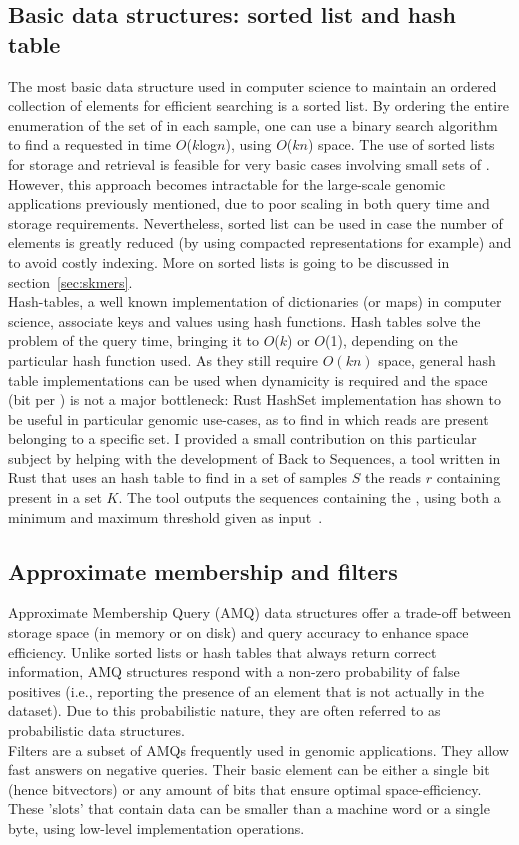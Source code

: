 \subsection{Basic data structures: sorted list and hash table}
The most basic data structure used in computer science to maintain an ordered collection of elements for efficient searching is a sorted list. By ordering the entire enumeration of the set of \kmers in each sample, one can use a binary search algorithm to find a requested \kmer in time $O$($k$log$n$), using $O$($kn$) space. The use of sorted lists for \kmer storage and retrieval is feasible for very basic cases involving small sets of \kmers. However, this approach becomes intractable for the large-scale genomic applications previously mentioned, due to poor scaling in both query time and storage requirements. Nevertheless, sorted list can be used in case the number of elements is greatly reduced (by using compacted \kmer representations for example) and to avoid costly indexing. More on sorted lists is going to be discussed in section~\ref{sec:skmers}.\\
Hash-tables, a well known implementation of dictionaries (or maps) in computer science, associate keys and values using hash functions. Hash tables solve the problem of the query time, bringing it to $O$($k$) or $O$(1), depending on the particular hash function used. As they still require $O(kn)$ space, general hash table implementations can be used when dynamicity is required and the space (bit per \kmer) is not a major bottleneck: Rust HashSet implementation has shown to be useful in particular genomic use-cases, as to find in which reads are present \kmers belonging to a specific set. I provided a small contribution on this particular subject by helping with the development of Back to Sequences, a tool written in Rust that uses an hash table to find in a set of samples $S$ the reads $r$ containing \kmers present in a set $K$. The tool outputs the sequences containing the \kmers, using both a minimum and maximum threshold given as input~\cite{back_to_sequences}.\\

\subsection{Approximate membership and filters}
Approximate Membership Query (AMQ) data structures offer a trade-off between storage space (in memory or on disk) and query accuracy to enhance space efficiency. Unlike sorted lists or hash tables that always return correct information, AMQ structures respond with a non-zero probability of false positives (i.e., reporting the presence of an element that is not actually in the dataset). Due to this probabilistic nature, they are often referred to as probabilistic data structures.\\
Filters are a subset of AMQs frequently used in genomic applications. They allow fast answers on negative queries. Their basic element can be either a single bit (hence bitvectors) or any amount of bits that ensure optimal space-efficiency. These 'slots' that contain data can be smaller than a machine word or a single byte, using low-level implementation operations.

